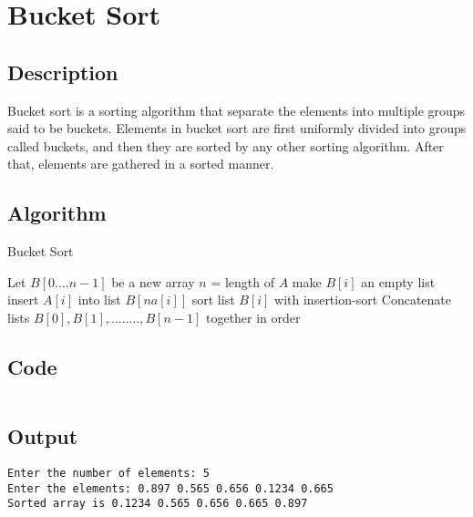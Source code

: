 \section{Bucket Sort}

\subsection{Description}
Bucket sort is a sorting algorithm that separate the elements into multiple groups said to be buckets. Elements in bucket sort are first uniformly divided into groups called buckets, and then they are sorted by any other sorting algorithm. After that, elements are gathered in a sorted manner.

\pagebreak

\subsection{Algorithm}


\begin{algorithm}
    \caption{Bucket Sort}
    \begin{algorithmic}[1]
        \State Let $B[0....n-1]$ be a new array
        \State $n$ = length of $A$
        \State make $B[i]$ an empty list
        \EndFor
        \State insert $A[i]$ into list $B[n a[i]]$
        \EndFor
        \State sort list $B[i]$ with insertion-sort
        \EndFor
        \State Concatenate lists $B[0], B[1],........, B[n-1]$ together in order
        \EndProcedure
    \end{algorithmic}
\end{algorithm}

\subsection{Code}

\inputminted[fontsize=\footnotesize,bgcolor=bg,linenos,autogobble,frame=single,framerule=0.01pt,rulecolor=FSBorder,stripall]{c++}{code/bucket.cpp}

\subsection{Output}

\begin{lstlisting}[style=output]
Enter the number of elements: 5
Enter the elements: 0.897 0.565 0.656 0.1234 0.665
Sorted array is 0.1234 0.565 0.656 0.665 0.897
\end{lstlisting}